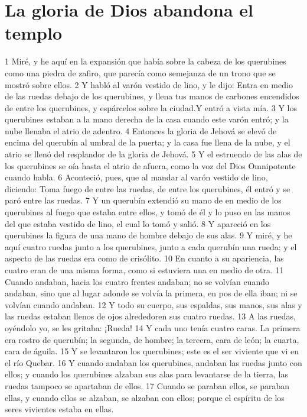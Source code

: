 \section*{La gloria de Dios abandona el templo}

1 Miré, y he aquí en la expansión que había sobre la cabeza de los querubines como una piedra de zafiro, que parecía como semejanza de un trono que se mostró sobre ellos. 
2 Y habló al varón vestido de lino, y le dijo: Entra en medio de las ruedas debajo de los querubines, y llena tus manos de carbones encendidos de entre los querubines, y espárcelos sobre la ciudad.Y entró a vista mía.
3 Y los querubines estaban a la mano derecha de la casa cuando este varón entró; y la nube llenaba el atrio de adentro.
4 Entonces la gloria de Jehová se elevó de encima del querubín al umbral de la puerta; y la casa fue llena de la nube, y el atrio se llenó del resplandor de la gloria de Jehová.
5 Y el estruendo de las alas de los querubines se oía hasta el atrio de afuera, como la voz del Dios Omnipotente cuando habla.
6 Aconteció, pues, que al mandar al varón vestido de lino, diciendo: Toma fuego de entre las ruedas, de entre los querubines, él entró y se paró entre las ruedas.
7 Y un querubín extendió su mano de en medio de los querubines al fuego que estaba entre ellos, y tomó de él y lo puso en las manos del que estaba vestido de lino, el cual lo tomó y salió.
8 Y apareció en los querubines la figura de una mano de hombre debajo de sus alas.
9 Y miré, y he aquí cuatro ruedas junto a los querubines, junto a cada querubín una rueda; y el aspecto de las ruedas era como de crisólito.
10 En cuanto a su apariencia, las cuatro eran de una misma forma, como si estuviera una en medio de otra.
11 Cuando andaban, hacia los cuatro frentes andaban; no se volvían cuando andaban, sino que al lugar adonde se volvía la primera, en pos de ella iban; ni se volvían cuando andaban.
12 Y todo su cuerpo, sus espaldas, sus manos, sus alas y las ruedas estaban llenos de ojos alrededoren sus cuatro ruedas.
13 A las ruedas, oyéndolo yo, se les gritaba: ¡Rueda! 
14 Y cada uno tenía cuatro caras. La primera era rostro de querubín; la segunda, de hombre; la tercera, cara de león; la cuarta, cara de águila. 
15 Y se levantaron los querubines; este es el ser viviente que vi en el río Quebar.
16 Y cuando andaban los querubines, andaban las ruedas junto con ellos; y cuando los querubines alzaban sus alas para levantarse de la tierra, las ruedas tampoco se apartaban de ellos.
17 Cuando se paraban ellos, se paraban ellas, y cuando ellos se alzaban, se alzaban con ellos; porque el espíritu de los seres vivientes estaba en ellas.
